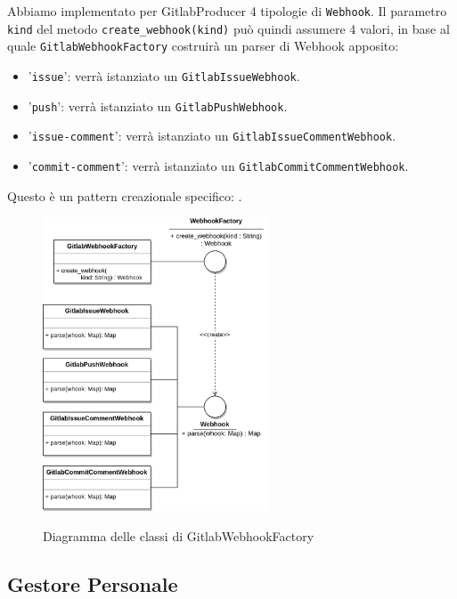 Abbiamo implementato per GitlabProducer 4 tipologie di \texttt{Webhook}.
Il parametro \texttt{kind} del metodo \texttt{create\_webhook(kind)} può quindi assumere 4 valori, in base al quale
\texttt{GitlabWebhookFactory} costruirà un parser di Webhook apposito:
\begin{itemize}
    \item '\texttt{issue}': verrà istanziato un \texttt{GitlabIssueWebhook}.
    \item '\texttt{push}': verrà istanziato un \texttt{GitlabPushWebhook}.
    \item '\texttt{issue-comment}': verrà istanziato un \texttt{GitlabIssueCommentWebhook}.
    \item '\texttt{commit-comment}': verrà istanziato un \texttt{GitlabCommitCommentWebhook}.
\end{itemize}

Questo è un pattern creazionale specifico: .


\begin{figure}[H]
    \centering
    \includegraphics[width=0.6\textwidth]{img/Producers-GitlabWebhook.png}\\
    \caption{Diagramma delle classi di GitlabWebhookFactory}
\end{figure}



\subsection{Gestore Personale}

